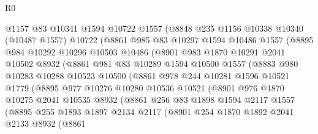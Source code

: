 \begin{lexlean}{R0}
\begin{coremodule}
            @1157
            @83
            @10341
            @1594
            @10722
            @1557
            (@8848
              @235
              @1156
              @10338
              @10340
              (@10487 @1557)
              @10722
              (@8861
                @985
                @83
                @10297
                @1594
                @10486
                @1557
                (@8895
                  @984
                  @10292
                  @10296
                  @10503
                  @10486
                  (@8901
                    @983
                    @1870
                    @10291
                    @2041
                    @10502
                    @8932
                    (@8861
                      @981
                      @83
                      @10289
                      @1594
                      @10500
                      @1557
                      (@8883
                        @980
                        @10283
                        @10288
                        @10523
                        @10500
                        (@8861
                          @978
                          @244
                          @10281
                          @1596
                          @10521
                          @1779
                          (@8895
                            @977
                            @10276
                            @10280
                            @10536
                            @10521
                            (@8901
                              @976
                              @1870
                              @10275
                              @2041
                              @10535
                              @8932
                              (@8861
                                @256
                                @83
                                @1898
                                @1594
                                @2117
                                @1557
                                (@8895
                                  @255
                                  @1893
                                  @1897
                                  @2134
                                  @2117
                                  (@8901
                                    @254
                                    @1870
                                    @1892
                                    @2041
                                    @2133
                                    @8932
                                    (@8861

\end{coremodule}
\end{lexlean}
